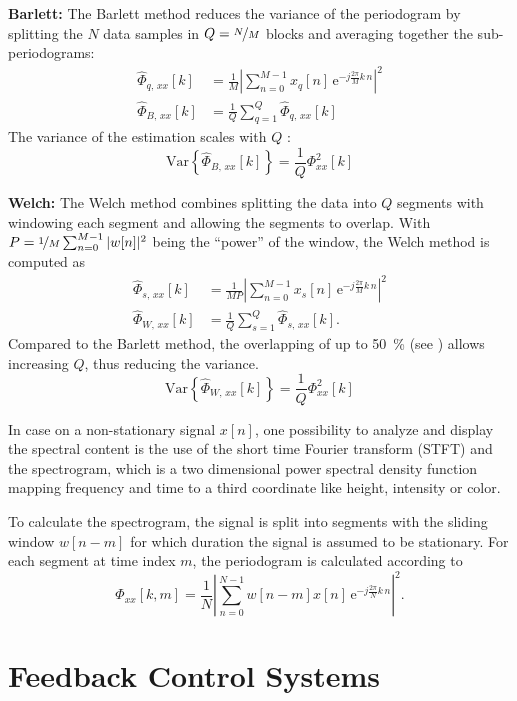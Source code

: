 \textbf{Barlett:} The Barlett method reduces the variance of the periodogram by splitting the $N$ data samples in $Q=\nicefrac{N}{M}$ blocks and averaging together the sub-periodograms:
\begin{align}
\hat{\Phi}_{q,\,xx}[k] &= \frac{1}{M} \left| \sum_{n=0}^{M-1} x_q[n]\,\text{e}^{-j\frac{2\pi}{M}k\,n}\right|^2\\
\hat{\Phi}_{B,\,xx}[k] &= \frac{1}{Q} \sum_{q=1}^{Q} \hat{\Phi}_{q,\,xx}[k]
\end{align}
The variance of the estimation scales with $Q$ \cite[p.~6]{Rowell2008}:
\begin{equation}
\text{Var}\left\{\hat{\Phi}_{B,\,xx}[k]\right\} = \frac{1}{Q}\Phi_{xx}^2[k]
\end{equation}

\textbf{Welch:} The Welch method combines splitting the data into $Q$ segments with windowing each segment and allowing the segments to overlap. With $P = \nicefrac{1}{M} \sum_{n=0}^{M-1} |w[n]|^2$ being the ``power'' of the window, the Welch method is computed as
\begin{align}
\hat{\Phi}_{s,\,xx}[k] &= \frac{1}{M P} \left| \sum_{n=0}^{M-1} x_s[n]\,\text{e}^{-j\frac{2\pi}{M}k\,n}\right|^2\\
\hat{\Phi}_{W,\,xx}[k] &= \frac{1}{Q} \sum_{s=1}^{Q} \hat{\Phi}_{s,\,xx}[k].
\end{align}
Compared to the Barlett method, the overlapping of up to \SI{50}{\percent} (see \cite{Welch1967}) allows increasing $Q$, thus reducing the variance.
\begin{equation}
\text{Var}\left\{\hat{\Phi}_{W,\,xx}[k]\right\} = \frac{1}{Q}\Phi_{xx}^2[k]
\end{equation}


In case on a non-stationary signal $x[n]$, one possibility to analyze and display the spectral content is the use of the short time Fourier transform (STFT) and the spectrogram, which is a two dimensional power spectral density function mapping frequency and time to a third coordinate like height, intensity or color.

To calculate the spectrogram, the signal is split into segments with the sliding window $w[n-m]$ for which duration the signal is assumed to be stationary. For each segment at time index $m$, the periodogram is calculated according to
\begin{equation}
\hat{\Phi}_{xx}[k,m] = \frac{1}{N} \left| \sum_{n=0}^{N-1} w[n-m] x[n]\,\text{e}^{-j\frac{2\pi}{N}k\,n}\right|^2.
\end{equation}

\section{Feedback Control Systems}








